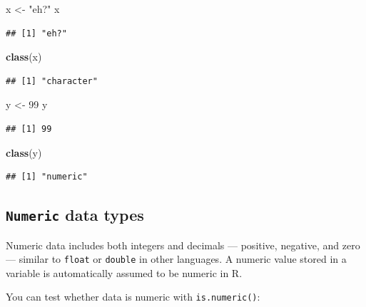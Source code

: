 \documentclass[]{book}
\newenvironment{Shaded}{\begin{snugshade}}{\end{snugshade}}
\newcommand{\DecValTok}[1]{\textcolor[rgb]{0.00,0.00,0.81}{#1}}
\newcommand{\KeywordTok}[1]{\textcolor[rgb]{0.13,0.29,0.53}{\textbf{#1}}}
\newcommand{\NormalTok}[1]{#1}
\newcommand{\StringTok}[1]{\textcolor[rgb]{0.31,0.60,0.02}{#1}}
\theoremstyle{definition}
\theoremstyle{definition}
\theoremstyle{definition}
\theoremstyle{remark}
\begin{document}
\begin{Shaded}
\begin{Highlighting}[]
\NormalTok{x <-}\StringTok{ "eh?"}
\NormalTok{x}
\end{Highlighting}
\end{Shaded}

\begin{verbatim}
## [1] "eh?"
\end{verbatim}

\begin{Shaded}
\begin{Highlighting}[]
\KeywordTok{class}\NormalTok{(x)}
\end{Highlighting}
\end{Shaded}

\begin{verbatim}
## [1] "character"
\end{verbatim}

\begin{Shaded}
\begin{Highlighting}[]
\NormalTok{y <-}\StringTok{ }\DecValTok{99}
\NormalTok{y}
\end{Highlighting}
\end{Shaded}

\begin{verbatim}
## [1] 99
\end{verbatim}

\begin{Shaded}
\begin{Highlighting}[]
\KeywordTok{class}\NormalTok{(y)}
\end{Highlighting}
\end{Shaded}

\begin{verbatim}
## [1] "numeric"
\end{verbatim}

\hypertarget{numeric-data-types}{%
\subsection{\texorpdfstring{\texttt{Numeric} data
types}{Numeric data types}}\label{numeric-data-types}}

Numeric data includes both integers and decimals --- positive, negative,
and zero --- similar to \texttt{float} or \texttt{double} in other
languages. A numeric value stored in a variable is automatically assumed
to be numeric in R.

You can test whether data is numeric with \texttt{is.numeric()}:
\end{document}
